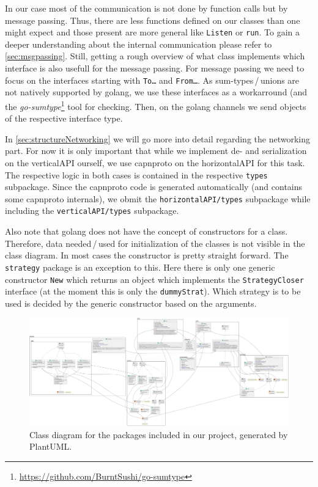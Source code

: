 \documentclass[a4paper,english,10pt,NET]{tumarticle}
\begin{document}
In our case most of the communication is not done by function calls but by message passing.
Thus, there are less functions defined on our classes than one might expect and those present are more general like \texttt{Listen} or \texttt{run}.
To gain a deeper understanding about the internal communication please refer to \cref{sec:msgpassing}.
Still, getting a rough overview of what class implements which interface is also usefull for the message passing.
For message passing we need to focus on the interfaces starting with \texttt{To\ldots} and \texttt{From\ldots}.
As sum-types\,/\,unions are not natively supported by golang, we use these interfaces as a workarround (and the \emph{go-sumtype}\footnote{\url{https://github.com/BurntSushi/go-sumtype}} tool for checking.
Then, on the golang channels we send objects of the respective interface type.

In \cref{sec:structureNetworking} we will go more into detail regarding the networking part.
For now it is only important that while we implement de- and serialization on the verticalAPI ourself, we use capnproto on the horizontalAPI for this task.
The respective logic in both cases is contained in the respective \texttt{types} subpackage.
Since the capnproto code is generated automatically (and contains some capnproto internals), we obmit the \texttt{horizontalAPI/types} subpackage while including the \texttt{verticalAPI/types} subpackage.

Also note that golang does not have the concept of constructors for a class.
Therefore, data needed\,/\,used for initialization of the classes is not visible in the class diagram.
In most cases the constructor is pretty straight forward.
The \texttt{strategy} package is an exception to this.
Here there is only one generic constructor \texttt{New} which returns an object which implements the \texttt{StrategyCloser} interface (at the moment this is only the \texttt{dummyStrat}).
Which strategy is to be used is decided by the generic constructor based on the arguments.

\begin{landscape}
	\pagestyle{empty}
	\begin{figure}
		\centering
		\hspace*{-0.1\linewidth}\includegraphics[width=1.2\linewidth]{figures/class}
		\caption{Class diagram for the packages included in our project, generated by PlantUML.}
		\label{fig:classDia}
	\end{figure}
\end{landscape}
\end{document}
